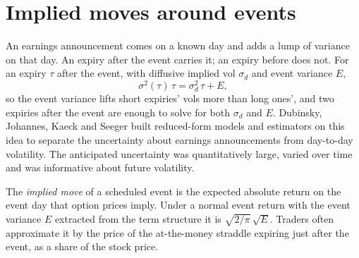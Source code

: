 \begin{omfigure}

\label{fig:s2:gamma-scalping-and-event-volatility:scalping}
\end{omfigure}

\section{Implied moves around events}

An earnings announcement comes on a known day and adds a lump of variance on that day. An expiry after the event carries it; an expiry before does not.
For an expiry $\tau$ after the event, with diffusive implied vol $\sigma_d$ and event variance $E$,
\[
\sigma^2(\tau)\,\tau = \sigma_d^2\,\tau + E,
\]
so the event variance lifts short expiries' vols more than long ones', and two expiries after the event are enough to solve for both $\sigma_d$ and
$E$. Dubinsky, Johannes, Kaeck and Seeger built reduced-form models and estimators on this idea to separate the uncertainty about earnings
announcements from day-to-day volatility. The anticipated uncertainty was quantitatively large, varied over time and was informative about future
volatility.

\begin{definition}\label{def:s2:gamma-scalping-and-event-volatility:move}
The \emph{implied move} of a scheduled event is the expected absolute return on the event day that option prices imply. Under a
normal event return with the event variance $E$ extracted from the term structure it is $\sqrt{2/\pi}\,\sqrt{E}$. Traders often approximate it by
the price of the at-the-money straddle expiring just after the event, as a share of the stock price.
\end{definition}

